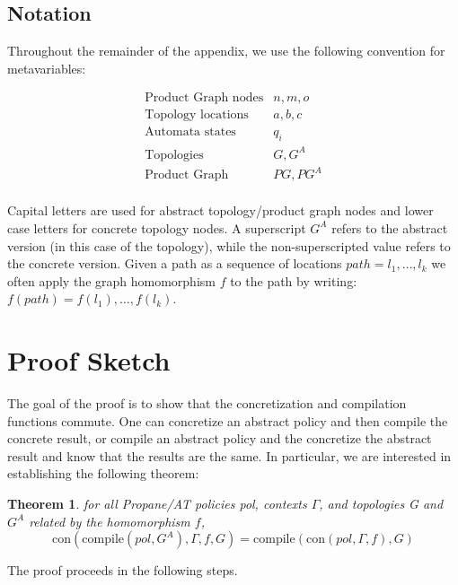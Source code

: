 \documentclass[twocolumn, openany]{sig-alternate-10pt}
\newcommand{\sysname}{{\small \sf Propane/AT}\xspace}
\newcommand{\Con}{\mathrm{con}}
\newcommand{\Compile}{\ensuremath{\mathrm{compile}}}
\newtheorem{thm}{Theorem}
\begin{document}
\subsection{Notation}

Throughout the remainder of the appendix, we use the following convention for metavariables:

\[ \begin{array}{ll}
  \text{Product Graph nodes} & n,m,o \\
  \text{Topology locations} & a,b,c \\
  \text{Automata states} & q_i \\
  \text{Topologies} & G, G^A \\
  \text{Product Graph} & PG, PG^A \\
\end{array} \]

Capital letters are used for abstract topology/product graph nodes and lower case letters for concrete topology nodes. A superscript $G^A$ refers to the abstract version (in this case of the topology), while the non-superscripted value refers to the concrete version. Given a path as a sequence of locations $path = l_1, \dots, l_k$ we often apply the graph homomorphism $f$ to the path by writing: $f(path) = f(l_1), \dots, f(l_k)$.


\newpage

\section{Proof Sketch}
\vspace{1em}

The goal of the proof is to show that the concretization and compilation functions commute. One can concretize an abstract policy and then compile the concrete result, or compile an abstract policy and the concretize the abstract result and know that the results are the same. In particular, we are interested in establishing the following theorem:

\begin{thm}
  for all \sysname policies pol, contexts $\Gamma$, and topologies G and $G^A$ related by the homomorphism $f$, 
  $$\Con(\Compile(pol,G^A),\Gamma,f,G) = \Compile(\Con(pol,\Gamma,f), G)$$
\end{thm}

\noindent
The proof proceeds in the following steps. 
\end{document}
